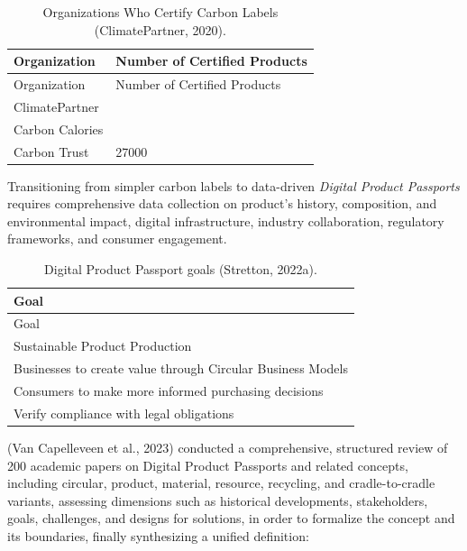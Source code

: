 \documentclass[
  12pt,
  letterpaper,
  DIV=11,
  numbers=noendperiod]{scrartcl}
\begin{document}
\def\pandoctableshortcapt{Organizations Who Certify Carbon Labels}

\begin{longtable}[]{@{}ll@{}}
\caption[Organizations Who Certify Carbon Labels]{Organizations Who
Certify Carbon Labels (ClimatePartner, 2020).}\tabularnewline
\toprule\noalign{}
Organization & Number of Certified Products \\
\midrule\noalign{}
\endfirsthead
\toprule\noalign{}
Organization & Number of Certified Products \\
\midrule\noalign{}
\endhead
\bottomrule\noalign{}
\endlastfoot
ClimatePartner & \\
Carbon Calories & \\
Carbon Trust & 27000 \\
\end{longtable}

\let\pandoctableshortcapt\relax

Transitioning from simpler carbon labels to data-driven \emph{Digital
Product Passports} requires comprehensive data collection on product's
history, composition, and environmental impact, digital infrastructure,
industry collaboration, regulatory frameworks, and consumer engagement.

\def\pandoctableshortcapt{Digital Product Passport Goals}

\begin{longtable}[]{@{}l@{}}
\caption[Digital Product Passport Goals]{Digital Product Passport goals
(Stretton, 2022a).}\tabularnewline
\toprule\noalign{}
Goal \\
\midrule\noalign{}
\endfirsthead
\toprule\noalign{}
Goal \\
\midrule\noalign{}
\endhead
\bottomrule\noalign{}
\endlastfoot
Sustainable Product Production \\
Businesses to create value through Circular Business Models \\
Consumers to make more informed purchasing decisions \\
Verify compliance with legal obligations \\
\end{longtable}

\let\pandoctableshortcapt\relax

(Van Capelleveen et al., 2023) conducted a comprehensive, structured
review of 200 academic papers on Digital Product Passports and related
concepts, including circular, product, material, resource, recycling,
and cradle-to-cradle variants, assessing dimensions such as historical
developments, stakeholders, goals, challenges, and designs for
solutions, in order to formalize the concept and its boundaries, finally
synthesizing a unified definition:
\end{document}
